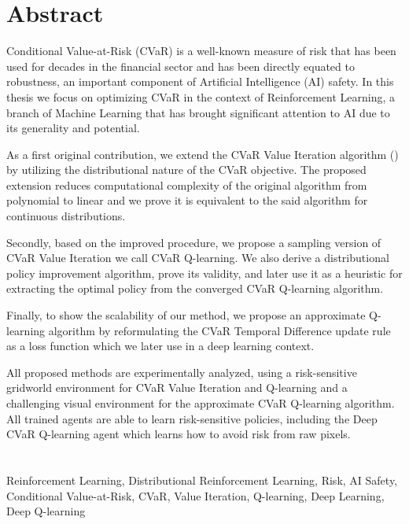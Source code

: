 \begingroup
\let\clearpage\relax
\let\cleardoublepage\relax
\let\cleardoublepage\relax

\chapter*{Abstract}

Conditional Value-at-Risk (CVaR) is a well-known measure of risk that has been used for decades in the financial sector and has been directly equated to robustness, an important component of Artificial Intelligence (AI) safety. In this thesis we focus on optimizing CVaR in the context of Reinforcement Learning, a branch of Machine Learning that has brought significant attention to AI due to its generality and potential.

As a first original contribution, we extend the CVaR Value Iteration algorithm (\citet{chow2015risk}) by utilizing the distributional nature of the CVaR objective. The proposed extension reduces computational complexity of the original algorithm from polynomial to linear and we prove it is equivalent to the said algorithm for continuous distributions.

Secondly, based on the improved procedure, we propose a sampling version of CVaR Value Iteration we call CVaR Q-learning. We also derive a distributional policy improvement algorithm, prove its validity, and later use it as a heuristic for extracting the optimal policy from the converged CVaR Q-learning algorithm.

Finally, to show the scalability of our method, we propose an approximate Q-learning algorithm by reformulating the CVaR Temporal Difference update rule as a loss function which we later use in a deep learning context.

All proposed methods are experimentally analyzed, using a risk-sensitive gridworld environment for CVaR Value Iteration and Q-learning and a challenging visual environment for the approximate CVaR Q-learning algorithm. All trained agents are able to learn risk-sensitive policies, including the  Deep CVaR Q-learning agent which learns how to avoid risk from raw pixels.
\\
\\
\\
 Reinforcement Learning, Distributional Reinforcement Learning, Risk, AI Safety, Conditional Value-at-Risk, CVaR, Value Iteration, Q-learning, Deep Learning, Deep Q-learning

